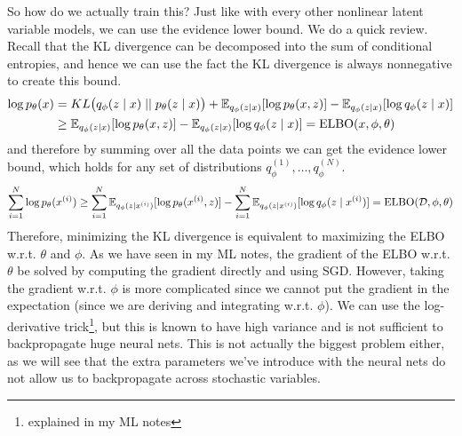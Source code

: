  So how do we actually train this? Just like with every other nonlinear latent variable models, we can use the evidence lower bound. We do a quick review. Recall that the KL divergence can be decomposed into the sum of conditional entropies, and hence we can use the fact the KL divergence is always nonnegative to create this bound. 
  \begin{align}
    \log p_\theta (x) & = KL \big( q_\phi (z \mid x) \mid\mid p_{\theta} (z \mid x) \big) + \mathbb{E}_{q_{\phi} (z \mid x)} [\log p_{\theta} (x, z)] - \mathbb{E}_{q_\phi(z \mid x)} [ \log q_{\phi} (z \mid x)] \\
                      & \geq \mathbb{E}_{q_{\phi} (z \mid x)} [\log p_{\theta} (x, z)] - \mathbb{E}_{q_\phi(z \mid x)} [ \log q_{\phi} (z \mid x)] = \elbo(x, \phi, \theta)
  \end{align}
  and therefore by summing over all the data points we can get the evidence lower bound, which holds for any set of distributions $q_\phi^{(1)}, \ldots, q_\phi^{(N)}$.  
  \begin{equation}
    \sum_{i=1}^N \log p_{\theta} (x^{(i)}) \geq \sum_{i=1}^N \mathbb{E}_{q_\phi (z \mid x^{(i)})} [ \log p_{\theta} (x^{(i)}, z)] - \sum_{i=1}^N \mathbb{E}_{q_{\phi} (z \mid x^{(i)})} [ \log q_{\phi} (z \mid x^{(i)}) ] = \elbo(\mathcal{D}, \phi, \theta)
  \end{equation}
  Therefore, minimizing the KL divergence is equivalent to maximizing the ELBO w.r.t. $\theta$ and $\phi$. As we have seen in my ML notes, the gradient of the ELBO w.r.t. $\theta$ be solved by computing the gradient directly and using SGD. However, taking the gradient w.r.t. $\phi$ is more complicated since we cannot put the gradient in the expectation (since we are deriving and integrating w.r.t. $\phi$). We can use the log-derivative trick\footnote{explained in my ML notes}, but this is known to have high variance and is not sufficient to backpropagate huge neural nets. This is not actually the biggest problem either, as we will see that the extra parameters we've introduce with the neural nets do not allow us to backpropagate across stochastic variables. 

